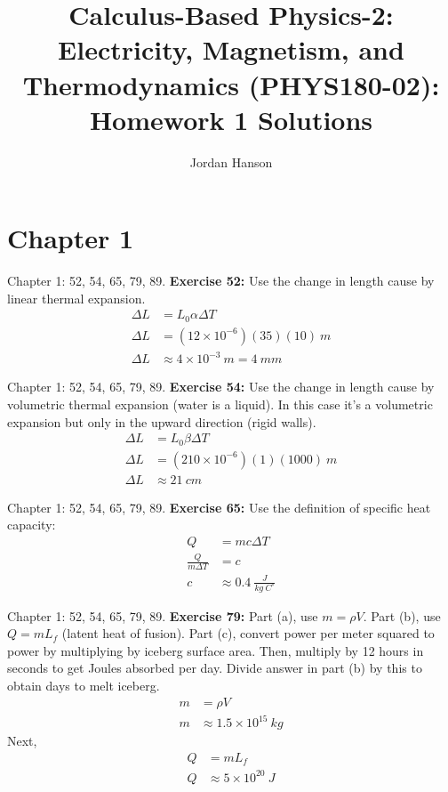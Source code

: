 \documentclass{beamer}
\title{Calculus-Based Physics-2: Electricity, Magnetism, and Thermodynamics (PHYS180-02): Homework 1 Solutions}
\author{Jordan Hanson}
\institute{Whittier College Department of Physics and Astronomy}
\begin{document}
\maketitle

\section{Chapter 1}

\begin{frame}{Chapter 1: 52, 54, 65, 79, 89.}
\textbf{Exercise 52:} Use the change in length cause by linear thermal expansion.
\begin{align}
\Delta L &= L_0 \alpha \Delta T \\
\Delta L &= (12\times 10^{-6})(35)(10)~m \\
\Delta L &\approx 4 \times 10^{-3}~m = 4~mm
\end{align}
\end{frame}

\begin{frame}{Chapter 1: 52, 54, 65, 79, 89.}
\textbf{Exercise 54:} Use the change in length cause by volumetric thermal expansion (water is a liquid). In this case it's a volumetric expansion but only in the upward direction (rigid walls).
\begin{align}
\Delta L &= L_0 \beta \Delta T \\
\Delta L &= (210\times 10^{-6})(1)(1000)~m \\
\Delta L &\approx 21 ~ cm
\end{align}
\end{frame}

\begin{frame}{Chapter 1: 52, 54, 65, 79, 89.}
\textbf{Exercise 65:} Use the definition of specific heat capacity:
\begin{align}
Q &= mc \Delta T \\
\frac{Q}{m\Delta T} &= c \\
c &\approx 0.4 ~ \frac{J}{kg~C^{\circ}}
\end{align}
\end{frame}

\begin{frame}{Chapter 1: 52, 54, 65, 79, 89.}
\small
\textbf{Exercise 79:} Part (a), use $m=\rho V$.  Part (b), use $Q = mL_f$ (latent heat of fusion).  Part (c), convert power per meter squared to power by multiplying by iceberg surface area.  Then, multiply by 12 hours in seconds to get Joules absorbed per day.  Divide answer in part (b) by this to obtain days to melt iceberg.
\begin{align}
m &= \rho V \\
m &\approx 1.5\times 10^{15}~kg
\end{align}
Next,
\begin{align}
Q &= m L_f \\
Q &\approx 5\times 10^{20}~J
\end{align}
\end{frame}
\end{document}
